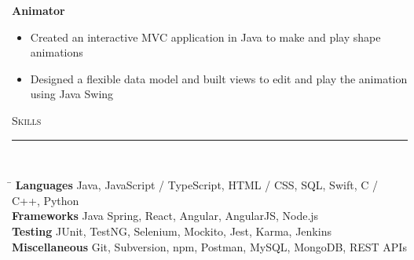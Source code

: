 \documentclass[11pt]{article}
\begin{document}
\begin{raggedright}
	\textbf{\large Animator} 
	\begin{itemize}
		\item Created an interactive MVC application in Java to make and play shape animations
		\item Designed a flexible data model and built views to edit and play the animation using Java Swing
	\end{itemize}
	\vspace{0.1in}
	
	
	\textsc{\Large Skills} \\
	\vspace{-0.1in}
	\rule{\textwidth}{0.4pt} \\
	\vspace{0.05in}

	\begin{tabbing}
		\hspace*{4cm}\= \kill
		\textbf{Languages}  \> Java, JavaScript / TypeScript, HTML / CSS, SQL, Swift, C / C++, Python \\
		\textbf{Frameworks} \> Java Spring, React, Angular, AngularJS, Node.js \\
		\textbf{Testing} \> JUnit, TestNG, Selenium, Mockito, Jest, Karma, Jenkins \\
		\textbf{Miscellaneous} \> Git, Subversion, npm, Postman, MySQL, MongoDB, REST APIs\\
	\end{tabbing}
		
\end{raggedright}	
\end{document}
